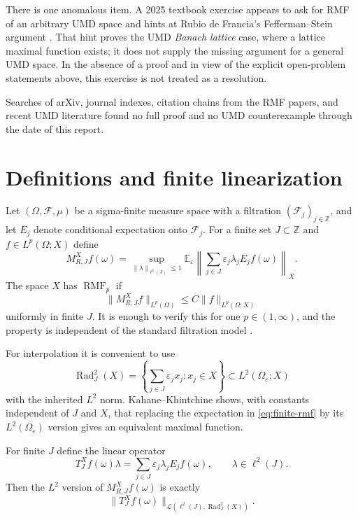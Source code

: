 \documentclass[11pt]{article}
\theoremstyle{definition}
\newcommand{\E}{\mathbb E}
\newcommand{\Rad}{\operatorname{Rad}}
\newcommand{\RMF}{\operatorname{RMF}}
\newcommand{\cL}{\mathcal L}
\newcommand{\cF}{\mathcal F}
\newcommand{\1}{\mathbf 1}
\newcommand{\eps}{\varepsilon}
\begin{document}
There is one anomalous item.  A 2025 textbook exercise appears to ask for RMF
of an arbitrary UMD space and hints at Rubio de Francia's Fefferman--Stein
argument \cite{UrbinaRios2025}.  That hint proves the UMD \emph{Banach lattice}
case, where a lattice maximal function exists; it does not supply the missing
argument for a general UMD space.  In the absence of a proof and in view of the
explicit open-problem statements above, this exercise is not treated as a
resolution.

Searches of arXiv, journal indexes, citation chains from the RMF papers, and
recent UMD literature found no full proof and no UMD counterexample through the
date of this report.

\section{Definitions and finite linearization}

Let $(\Omega,\cF,\mu)$ be a sigma-finite measure space with a filtration
$(\cF_j)_{j\in\mathbb Z}$, and let $E_j$ denote conditional expectation onto
$\cF_j$.  For a finite set $J\subset\mathbb Z$ and $f\in L^p(\Omega;X)$ define
\begin{equation}\label{eq:finite-rmf}
 M_{R,J}^X f(\omega)
 =\sup_{\|\lambda\|_{\ell^2(J)}\le 1}
   \E_{\eps}\left\|\sum_{j\in J}\eps_j\lambda_j E_jf(\omega)\right\|_X.
\end{equation}
The space $X$ has $\RMF_p$ if
\begin{equation}\label{eq:rmfp}
 \|M_{R,J}^Xf\|_{L^p(\Omega)}\le C\|f\|_{L^p(\Omega;X)}
\end{equation}
uniformly in finite $J$.  It is enough to verify this for one
$p\in(1,\infty)$, and the property is independent of the standard filtration
model \cite{HMP,Kemppainen2011}.

For interpolation it is convenient to use
\[
 \Rad_J^2(X)
 =\left\{\sum_{j\in J}\eps_jx_j:x_j\in X\right\}
 \subset L^2(\Omega_\eps;X)
\]
with the inherited $L^2$ norm.  Kahane--Khintchine shows, with constants
independent of $J$ and $X$, that replacing the expectation in
\eqref{eq:finite-rmf} by its $L^2(\Omega_\eps)$ version gives an equivalent
maximal function.

For finite $J$ define the linear operator
\begin{equation}\label{eq:TJ}
 T_J^Xf(\omega)\lambda
 =\sum_{j\in J}\eps_j\lambda_jE_jf(\omega),
 \qquad \lambda\in\ell^2(J).
\end{equation}
Then the $L^2$ version of $M_{R,J}^Xf(\omega)$ is exactly
\[
 \|T_J^Xf(\omega)\|_{\cL(\ell^2(J),\Rad_J^2(X))}.
\]
\end{document}
